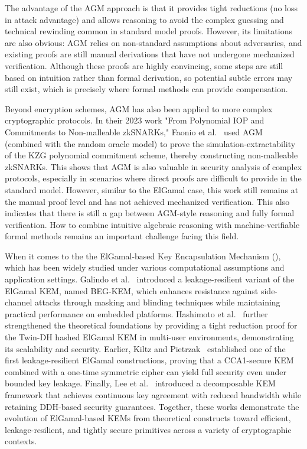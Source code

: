 The advantage of the AGM approach is that it provides tight reductions (no loss in attack advantage) and allows reasoning to avoid the complex guessing and technical rewinding common in standard model proofs. However, its limitations are also obvious: AGM relies on non-standard assumptions about adversaries, and existing proofs are still manual derivations that have not undergone mechanized verification. Although these proofs are highly convincing, some steps are still based on intuition rather than formal derivation, so potential subtle errors may still exist, which is precisely where formal methods can provide compensation.

Beyond encryption schemes, AGM has also been applied to more complex cryptographic protocols. In their 2023 work "From Polynomial IOP and Commitments to Non-malleable zkSNARKs," Faonio et al.~\cite{faonio2023} used AGM (combined with the random oracle model) to prove the simulation-extractability of the KZG polynomial commitment scheme, thereby constructing non-malleable zkSNARKs. This shows that AGM is also valuable in security analysis of complex protocols, especially in scenarios where direct proofs are difficult to provide in the standard model. However, similar to the ElGamal case, this work still remains at the manual proof level and has not achieved mechanized verification. This also indicates that there is still a gap between AGM-style reasoning and fully formal verification. How to combine intuitive algebraic reasoning with machine-verifiable formal methods remains an important challenge facing this field.

When it comes to the the ElGamal-based Key Encapsulation Mechanism (\KEM), which has been widely studied under various computational assumptions and application settings. Galindo et al.~\cite{galindo2016} introduced a leakage-resilient variant of the ElGamal KEM, named BEG-KEM, which enhances resistance against side-channel attacks through masking and blinding techniques while maintaining practical performance on embedded platforms. Hashimoto et al.~\cite{hashimoto2022} further strengthened the theoretical foundations by providing a tight reduction proof for the Twin-DH hashed ElGamal KEM in multi-user environments, demonstrating its scalability and security. Earlier, Kiltz and Pietrzak~\cite{kiltz2010} established one of the first leakage-resilient ElGamal constructions, proving that a CCA1-secure KEM combined with a one-time symmetric cipher can yield full \INDCCAone security even under bounded key leakage. Finally, Lee et al.~\cite{lee2023} introduced a decomposable KEM framework that achieves continuous key agreement with reduced bandwidth while retaining DDH-based security guarantees. 
Together, these works demonstrate the evolution of ElGamal-based KEMs from theoretical constructs toward efficient, leakage-resilient, and tightly secure primitives across a variety of cryptographic contexts.
